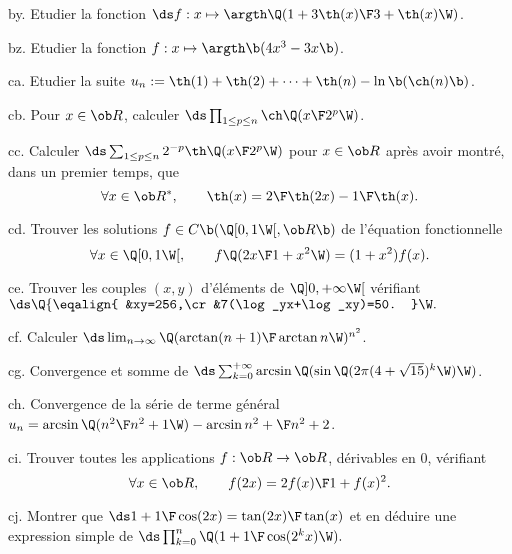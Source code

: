 \exo [Level=1,Fight=2,Learn=1,Field=\Fonctions,Type=\Exercices,Origin=] by. 
Etudier la fonction $\ds f:x\mapsto\argth\Q({1+3\th(x)\F3+\th(x)}\W)$. 

\exo [Level=1,Fight=2,Learn=1,Field=\Fonctions,Type=\Exercices,Origin=] bz. 
Etudier la fonction $f:x\mapsto\argth\b(4x^3-3x\b)$. 

\exo [Level=1,Fight=1,Learn=1,Field=\Suites|\TrigonométrieHyperbolique,Type=\Exercices,Origin=] ca. 
Etudier la suite $u_n:=\th(1)+\th(2)+\cdots+\th(n)-\ln\b(\ch(n)\b)$. 

\exo [Level=1,Fight=1,Learn=0,Field=\TrigonométrieHyperbolique,Type=\Exercices,Origin=] cb. 
Pour $x\in\ob R$, calculer $\ds\prod_{1\le p\le n}\ch\Q({x\F 2^p}\W)$. 

\exo [Level=1,Fight=1,Learn=1,Field=\TrigonométrieHyperbolique,Type=\Exercices,Origin=] cc. 
Calculer $\ds\sum_{1\le p\le n}2^{-p}\th\Q({x\F2^p}\W)$ pour $x\in\ob R$ après avoir montré, dans un premier temps, que 
$$
\forall x\in\ob R^*, \qquad \th(x)={2\F\th(2x)}-{1\F \th(x)}.
$$

\exo  [Level=1,Fight=3,Learn=1,Field=\Fonctions|\Trigonométrie,Type=\Exercices,Origin=] cd. 
Trouver les solutions $f\in\sc C\b(\Q[0,1\W[,\ob R\b)$ de l'équation fonctionnelle
$$
\forall x\in\Q[0,1\W[,\qquad f\Q({2x\F1+x^2}\W)=(1+x^2)f(x).
$$

\exo [Level=1,Fight=1,Learn=0,Field=\Fonctions,Type=\Exercices,Origin=] ce. 
Trouver les couples $(x,y)$ d'éléments de $\Q]0,+\infty\W[$ vérifiant 
$\ds 
\Q\{\eqalign{
&xy=256,\cr
&7(\log_yx+\log_xy)=50.
}\W.
$

\exo [Level=1,Fight=2,Learn=1,Field=\DéveloppementsLimités,Type=\Exercices,Origin=] cf. 
Calculer $\ds \lim_{n\to\infty}\Q({\arctan(n+1)\F\arctan n}\W)^{n^2}$. 

\exo [Level=2,Fight=3,Learn=1,Field=\Séries,Type=\Exercices,Origin=] cg. 
Convergence et somme de $\ds\sum_{k=0}^{+\infty}\arcsin\Q(\sin\Q(2\pi(4+\sqrt{15})^k\W)\W)$. 

\exo [Level=2,Fight=2,Learn=1,Field=\Séries,Type=\Exercices,Origin=] ch. 
Convergence de la série de terme général $u_n=\arcsin\Q({n^2\F n^2+1}\W)-\arcsin{n^2+\F n^2+2}$. 

\exo [Level=1,Fight=3,Learn=1,Field=\Fonctions,Type=\Exercices,Origin=] ci. 
Trouver toutes les applications $f:\ob R\to\ob R$, dérivables en $0$, vérifiant 
$$
\forall x\in\ob R, \qquad f(2x)={2f(x)\F1+f(x)^2}.
$$

\exo [Level=1,Fight=1,Learn=1,Field=\Trigonométrie,Type=\Exercices,Origin=] cj. 
Montrer que $\ds1+{1\F\cos(2x)}={\tan(2x)\F\tan(x)}$ et en déduire une expression simple de $\ds
\prod_{k=0}^n\Q(1+{1\F\cos(2^kx)}\W).
$

